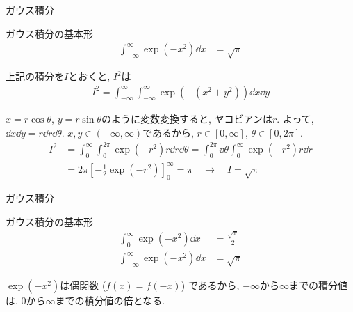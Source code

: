 \documentclass[dvipdfmx,notheorems,t]{beamer}
\begin{document}
\begin{frame}{ガウス積分}
\begin{block}{ガウス積分の基本形}
  \begin{align*}
    \int_{-\infty}^\infty \exp \left( -x^2 \right) \dd{x} &= \sqrt{\pi}
  \end{align*}
\end{block}

上記の積分を$I$とおくと, $I^2$は
\begin{align*}
  I^2 = \int_{-\infty}^\infty \int_{-\infty}^\infty
    \exp \left( - \left( x^2 + y^2 \right) \right) \dd{x} \dd{y}
\end{align*}

$x = r \cos \theta$, $y = r \sin \theta$のように変数変換すると, ヤコビアンは$r$.
よって, $\dd{x} \dd{y} = r \dd{r} \dd{\theta}$.
$x, y \in (-\infty, \infty)$であるから, $r \in [0, \infty]$, $\theta \in [0, 2\pi]$.
\begin{align*}
  I^2 &= \int_0^\infty \int_0^{2\pi} \exp \left( -r^2 \right) r \dd{r} \dd{\theta}
    = \int_0^{2\pi} \dd{\theta} \int_0^\infty \exp \left( -r^2 \right) r \dd{r} \\
    &= 2 \pi \left[ -\frac{1}{2} \exp \left( -r^2 \right) \right]_0^\infty
    = \pi \quad \longrightarrow \quad I = \sqrt{\pi}
\end{align*}
\end{frame}

\begin{frame}{ガウス積分}
\begin{block}{ガウス積分の基本形}
  \begin{align*}
    \int_0^\infty \exp \left( -x^2 \right) \dd{x} &= \frac{\sqrt{\pi}}{2} \\
    \int_{-\infty}^\infty \exp \left( -x^2 \right) \dd{x} &= \sqrt{\pi}
  \end{align*}
\end{block}

$\exp \left( -x^2 \right)$は偶関数 ($f(x) = f(-x)$) であるから,
$-\infty$から$\infty$までの積分値は, $0$から$\infty$までの積分値の倍となる.
\end{frame}
\end{document}
